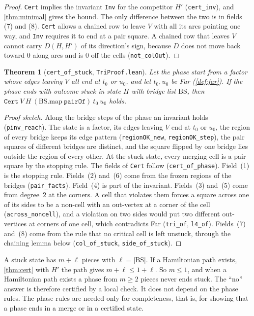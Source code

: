 \documentclass[11pt]{article}
\theoremstyle{plain}
\newtheorem{theorem}{Theorem}[section]
\theoremstyle{definition}
\theoremstyle{remark}
\newcommand{\lean}[1]{\texttt{#1}}
\begin{document}
\begin{proof}
\lean{Cert} implies the invariant \lean{Inv} for the competitor $H'$ (\lean{cert\_inv}), and
\cref{thm:minimal} gives the bound.
The only difference between the two is in fields (7) and (8).
\lean{Cert} allows a chained row to leave $V$ with all its arcs pointing one way, and \lean{Inv}
requires it to end at a pair square.
A chained row that leaves $V$ cannot carry $D(H,H')$ of its direction's sign, because $D$ does not
move back toward $0$ along arcs and is $0$ off the cells (\lean{not\_colOut}).
\end{proof}

\begin{theorem}[\lean{cert\_of\_stuck}, \lean{TriProof.lean}]
\label{thm:stuckcert}
Let the phase start from a factor whose edges leaving $V$ all end at $t_0$ or $u_0$, and let
$t_0,u_0$ be Far (\cref{def:far}).
If the phase ends with outcome stuck in state $H$ with bridge list $\mathrm{BS}$, then
$\lean{Cert}\ V\ H\ (\mathrm{BS}.\mathrm{map}\ \lean{pairOf})\ t_0\ u_0$ holds.
\end{theorem}

\begin{proof}[Proof sketch]
Along the bridge steps of the phase an invariant holds (\lean{pinv\_reach}).
The state is a factor, its edges leaving $V$ end at $t_0$ or $u_0$, the region of every bridge keeps
its edge pattern (\lean{regionOK\_new}, \lean{regionOK\_step}), the pair squares of different bridges
are distinct, and the square flipped by one bridge lies outside the region of every other.
At the stuck state, every merging cell is a pair square by the stopping rule.
The fields of \lean{Cert} follow (\lean{cert\_of\_phase}).
Field~(1) is the stopping rule.
Fields~(2) and~(6) come from the frozen regions of the bridges (\lean{pair\_facts}).
Field~(4) is part of the invariant.
Fields~(3) and~(5) come from degree~$2$ at the corners.
A cell that violates them forces a square across one of its sides to be a non-cell with an
out-vertex at a corner of the cell (\lean{across\_noncell}), and a violation on two sides would put
two different out-vertices at corners of one cell, which contradicts Far (\lean{tri\_of},
\lean{l4\_of}).
Fields~(7) and~(8) come from the rule that no critical cell is left unstuck, through the chaining
lemma below (\lean{col\_of\_stuck}, \lean{side\_of\_stuck}).
\end{proof}

A stuck state has $m+\ell$ pieces with $\ell=|\mathrm{BS}|$.
If a Hamiltonian path exists, \cref{thm:cert} with $H'$ the path gives $m+\ell\le 1+\ell$.
So $m\le1$, and when a Hamiltonian path exists a phase from $m\ge2$ pieces never ends stuck.
The ``no'' answer is therefore certified by a local check.
It does not depend on the phase rules.
The phase rules are needed only for completeness, that is, for showing that a phase ends in a
merge or in a certified state.
\end{document}

